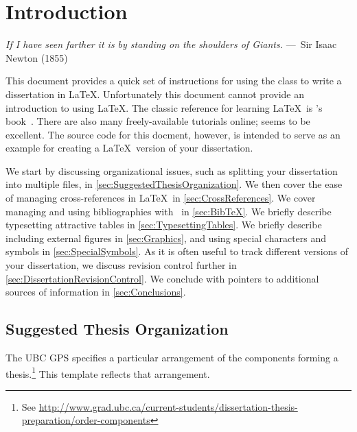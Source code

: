 
\chapter{Introduction}
\label{ch:Introduction}

\begin{epigraph}
	\emph{If I have seen farther it is by standing on the shoulders of
		Giants.} ---~Sir Isaac Newton (1855)
\end{epigraph}

This document provides a quick set of instructions for using the
 class to write a dissertation in \LaTeX. 
Unfortunately this document cannot provide an introduction to using
\LaTeX.  The classic reference for learning \LaTeX\ is
\citeauthor{lamport-1994-ladps}'s
book~\cite{lamport-1994-ladps}.  There are also many freely-available
tutorials online;
seems to be excellent.
The source code for this docment, however, is intended to serve as
an example for creating a \LaTeX\ version of your dissertation.

We start by discussing organizational issues, such as splitting
your dissertation into multiple files, in
\autoref{sec:SuggestedThesisOrganization}.
We then cover the ease of managing cross-references in \LaTeX\ in
\autoref{sec:CrossReferences}.
We cover managing and using bibliographies with \BibTeX\ in
\autoref{sec:BibTeX}. 
We briefly describe typesetting attractive tables in
\autoref{sec:TypesettingTables}.
We briefly describe including external figures in
\autoref{sec:Graphics}, and using special characters and symbols
in \autoref{sec:SpecialSymbols}.
As it is often useful to track different versions of your dissertation,
we discuss revision control further in
\autoref{sec:DissertationRevisionControl}. 
We conclude with pointers to additional sources of information in
\autoref{sec:Conclusions}.

\section{Suggested Thesis Organization}
\label{sec:SuggestedThesisOrganization}

The \acs{UBC} \acf{GPS} specifies a particular arrangement of the
components forming a thesis.\footnote{See
	\url{http://www.grad.ubc.ca/current-students/dissertation-thesis-preparation/order-components}}
This template reflects that arrangement.

